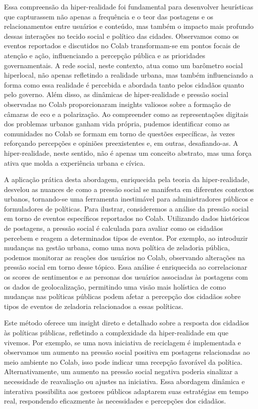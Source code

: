 Essa compreensão da hiper-realidade foi fundamental para desenvolver heurísticas que capturassem não apenas a frequência e o teor das postagens e os relacionamentos entre usuários e conteúdo, mas também o impacto mais profundo dessas interações no tecido social e político das cidades. Observamos como os eventos reportados e discutidos no Colab transformam-se em pontos focais de atenção e ação, influenciando a percepção pública e as prioridades governamentais. A rede social, neste contexto, atua como um barômetro social hiperlocal, não apenas refletindo a realidade urbana, mas também influenciando a forma como essa realidade é percebida e abordada tanto pelos cidadãos quanto pelo governo.  Além disso, as dinâmicas de hiper-realidade e pressão social observadas no Colab proporcionaram insights valiosos sobre a formação de câmaras de eco e a polarização. Ao compreender como as representações digitais dos problemas urbanos ganham vida própria, pudemos identificar como as comunidades no Colab se formam em torno de questões específicas, às vezes reforçando percepções e opiniões preexistentes e, em outras, desafiando-as. A hiper-realidade, neste sentido, não é apenas um conceito abstrato, mas uma força ativa que molda a experiência urbana e cívica.

A aplicação prática desta abordagem, enriquecida pela teoria da hiper-realidade, desvelou as nuances de como a pressão social se manifesta em diferentes contextos urbanos, tornando-se uma ferramenta inestimável para administradores públicos e formuladores de políticas. Para ilustrar, consideremos a análise da pressão social em torno de eventos específicos reportados no Colab. Utilizando dados históricos de postagens, a pressão social é calculada para avaliar como os cidadãos percebem e reagem a determinados tipos de eventos. Por exemplo, ao introduzir mudanças na gestão urbana, como uma nova política de zeladoria pública, podemos monitorar as reações dos usuários no Colab, observando alterações na pressão social em torno desse tópico. Essa análise é enriquecida ao correlacionar os scores de sentimentos e as personas dos usuários associadas às postagens com os dados de geolocalização, permitindo uma visão mais holística de como mudanças nas políticas públicas podem afetar a percepção dos cidadãos sobre tipos de eventos de zeladoria relacionados a essas políticas.

Este método oferece um insight direto e detalhado sobre a resposta dos cidadãos às políticas públicas, refletindo a complexidade da hiper-realidade em que vivemos. Por exemplo, se uma nova iniciativa de reciclagem é implementada e observamos um aumento na pressão social positiva em postagens relacionadas ao meio ambiente no Colab, isso pode indicar uma recepção favorável da política. Alternativamente, um aumento na pressão social negativa poderia sinalizar a necessidade de reavaliação ou ajustes na iniciativa. Essa abordagem dinâmica e interativa possibilita aos gestores públicos adaptarem suas estratégias em tempo real, respondendo eficazmente às necessidades e percepções dos cidadãos.

